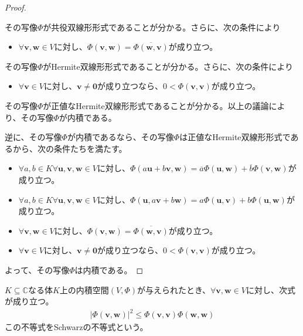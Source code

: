\documentclass[dvipdfmx]{jsarticle}
\begin{document}
\begin{proof}
\begin{itemize}
\end{itemize}
その写像$\varPhi$が共役双線形形式であることが分かる。さらに、次の条件により
\begin{itemize}
\item
  $\forall\mathbf{v},\mathbf{w} \in V$に対し、$\varPhi\left( \mathbf{v},\mathbf{w} \right) = \overline{\varPhi\left( \mathbf{w},\mathbf{v} \right)}$が成り立つ。
\end{itemize}
その写像$\varPhi$がHermite双線形形式であることが分かる。さらに、次の条件により
\begin{itemize}
\item
  $\forall\mathbf{v} \in V$に対し、$\mathbf{v} \neq \mathbf{0}$が成り立つなら、$0 < \varPhi\left( \mathbf{v},\mathbf{v} \right)$が成り立つ。
\end{itemize}
その写像$\varPhi$が正値なHermite双線形形式であることが分かる。以上の議論により、その写像$\varPhi$が内積である。\par
逆に、その写像$\varPhi$が内積であるなら、その写像$\varPhi$は正値なHermite双線形形式であるから、次の条件たちを満たす。
\begin{itemize}
\item
  $\forall a,b \in K\forall\mathbf{u},\mathbf{v},\mathbf{w} \in V$に対し、$\varPhi\left( a\mathbf{u} + b\mathbf{v},\mathbf{w} \right) = \overline{a}\varPhi\left( \mathbf{u},\mathbf{w} \right) + \overline{b}\varPhi\left( \mathbf{v},\mathbf{w} \right)$が成り立つ。
\item
  $\forall a,b \in K\forall\mathbf{u},\mathbf{v},\mathbf{w} \in V$に対し、$\varPhi\left( \mathbf{u},a\mathbf{v} + b\mathbf{w} \right) = a\varPhi\left( \mathbf{u},\mathbf{v} \right) + b\varPhi\left( \mathbf{u},\mathbf{w} \right)$が成り立つ。
\item
  $\forall\mathbf{v},\mathbf{w} \in V$に対し、$\varPhi\left( \mathbf{v},\mathbf{w} \right) = \overline{\varPhi\left( \mathbf{w},\mathbf{v} \right)}$が成り立つ。
\item
  $\forall\mathbf{v} \in V$に対し、$\mathbf{v} \neq \mathbf{0}$が成り立つなら、$0 < \varPhi\left( \mathbf{v},\mathbf{v} \right)$が成り立つ。
\end{itemize}
よって、その写像$\varPhi $は内積である。
\end{proof}
\begin{thm}[Schwarzの不等式]\label{2.3.6.2}
$K \subseteq \mathbb{C}$なる体$K$上の内積空間$(V,\varPhi)$が与えられたとき、$\forall\mathbf{v},\mathbf{w} \in V$に対し、次式が成り立つ。
\begin{align*}
\left| \varPhi\left( \mathbf{v},\mathbf{w} \right) \right|^{2} \leq \varPhi\left( \mathbf{v},\mathbf{v} \right)\varPhi\left( \mathbf{w},\mathbf{w} \right)
\end{align*}
この不等式をSchwarzの不等式という。
\end{thm}
\end{document}
